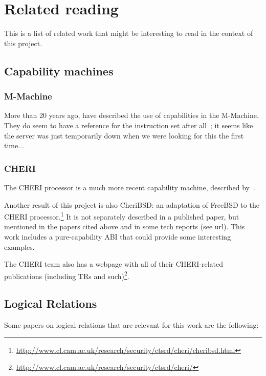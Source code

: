\documentclass[a4paper]{article}
\begin{document}
\section{Related reading}
\label{sec:related-reading}

This is a list of related work that might be interesting to read in the context
of this project.

\subsection{Capability machines}
\label{sec:rw-cap-machines}

\subsubsection{M-Machine}
More than 20 years ago, \cite{Carter:1994:HSF:195473.195579} have described the
use of capabilities in the M-Machine. They do seem to have a reference for the
instruction set after all~\citep{Dally1997Memo59}; it seems like the server was
just temporarily down when we were looking for this the first time...

\subsubsection{CHERI}

The CHERI processor is a much more recent capability machine, described
by~\cite{Woodruff:2014:CCM:2665671.2665740,Watson2015Cheri}.

Another result of this project is also CheriBSD: an adaptation of FreeBSD to the
CHERI
processor.\footnote{\url{http://www.cl.cam.ac.uk/research/security/ctsrd/cheri/cheribsd.html}}
It is not separately described in a published paper, but mentioned in the papers
cited above and in some tech reports (see url). This work includes a
pure-capability ABI that could provide some interesting examples.

The CHERI team also has a webpage with all of their CHERI-related publications
(including TRs and
such)\footnote{\url{http://www.cl.cam.ac.uk/research/security/ctsrd/cheri/}}.

\subsection{Logical Relations}
\label{sec:rw-log-rel}

Some papers on logical relations that are relevant for this work are the
following:
\end{document}
